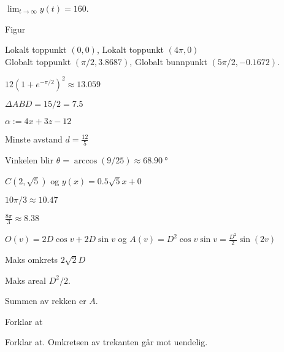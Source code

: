 \begin{Kortesvar}
\begin{losning}
  \item   $ \displaystyle \lim_{t \to \infty} y(t) = 160 $.

    \kortsvar	%

  \item  Figur

  \item  Lokalt toppunkt $(0,0)$, Lokalt toppunkt $(4\pi,0)$ \\
    Globalt toppunkt $(\pi/2,\num{3.8687})$, Globalt bunnpunkt
    $(5\pi/2,-\num{0.1672})$.

  \item $\displaystyle 12 \left( 1 + e^{-\pi/2} \right)^2 \approx \num{13.059}$

    \kortsvar	%

  \item   $ \Delta ABD = 15/2 = \num{7.5} $

  \item 	$ \alpha:= 4x + 3z - 12 $

  \item   Minste avstand $ d = \frac{12}{5} $

  \item   Vinkelen blir $ \theta = \arccos(9/25) \approx \SI{68.90}{\degree} $

    \kortsvar	%

  \item 	$ C(2,\sqrt{5})$ og $y(x) = 0.5\sqrt{5}x + 0 $

  \item	$ 10\pi/3 \approx \num{10.47} $

  \item	$ \frac{8\pi}{3} \approx \num{8.38} $

    \kortsvar	%

  \item $O(v) = 2D \cos v + 2D \sin v$ og $A(v) = D^2 \cos v \sin v =
    \frac{D^2}{2} \sin (2v) $

  \item Maks omkrets $2\sqrt{2} D$

  \item Maks areal $D^2/2$.

    \kortsvar	%

  \item   Summen av rekken er $A$.

  \item   Forklar at

  \item 	Forklar at. Omkretsen av trekanten går mot uendelig.

  \end{losning}
  \hypersetup{
    linkcolor = black,
  }
\end{Kortesvar}
